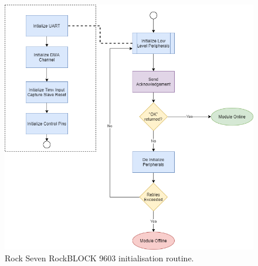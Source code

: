 \begin{figure}[H]
	\centering
	\includegraphics[scale=0.3]{Iridium Init Routine.png}
	\caption{Rock Seven RockBLOCK 9603 initialisation routine.}
	\label{fig:Init_diagram_ir}
\end{figure}


